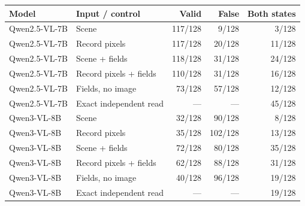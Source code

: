 \begin{tabular}{llrrr}
\toprule
Model & Input / control & Valid & False & Both states \\
\midrule
Qwen2.5-VL-7B & Scene & 117/128 & 9/128 & 3/128 \\
Qwen2.5-VL-7B & Record pixels & 117/128 & 20/128 & 11/128 \\
Qwen2.5-VL-7B & Scene + fields & 118/128 & 31/128 & 24/128 \\
Qwen2.5-VL-7B & Record pixels + fields & 110/128 & 31/128 & 16/128 \\
Qwen2.5-VL-7B & Fields, no image & 73/128 & 57/128 & 12/128 \\
Qwen2.5-VL-7B & Exact independent read & --- & --- & 45/128 \\
Qwen3-VL-8B & Scene & 32/128 & 90/128 & 8/128 \\
Qwen3-VL-8B & Record pixels & 35/128 & 102/128 & 13/128 \\
Qwen3-VL-8B & Scene + fields & 72/128 & 80/128 & 35/128 \\
Qwen3-VL-8B & Record pixels + fields & 62/128 & 88/128 & 31/128 \\
Qwen3-VL-8B & Fields, no image & 40/128 & 96/128 & 19/128 \\
Qwen3-VL-8B & Exact independent read & --- & --- & 19/128 \\
\bottomrule
\end{tabular}
